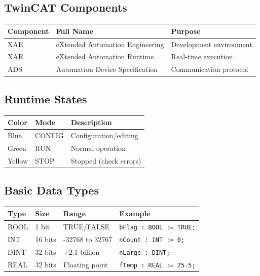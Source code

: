 \documentclass[11pt,a4paper]{article}
\begin{document}
\subsection*{TwinCAT Components}

\begin{table}[h]
\centering
\begin{tabular}{@{}lll@{}}
\toprule
\textbf{Component} & \textbf{Full Name} & \textbf{Purpose} \\
\midrule
XAE & eXtended Automation Engineering & Development environment \\
XAR & eXtended Automation Runtime & Real-time execution \\
ADS & Automation Device Specification & Communication protocol \\
\bottomrule
\end{tabular}
\end{table}

\subsection*{Runtime States}

\begin{table}[h]
\centering
\begin{tabular}{@{}lll@{}}
\toprule
\textbf{Color} & \textbf{Mode} & \textbf{Description} \\
\midrule
Blue & CONFIG & Configuration/editing \\
Green & RUN & Normal operation \\
Yellow & STOP & Stopped (check errors) \\
\bottomrule
\end{tabular}
\end{table}

\subsection*{Basic Data Types}

\begin{table}[h]
\centering
\begin{tabular}{@{}llll@{}}
\toprule
\textbf{Type} & \textbf{Size} & \textbf{Range} & \textbf{Example} \\
\midrule
BOOL & 1 bit & TRUE/FALSE & \texttt{bFlag : BOOL := TRUE;} \\
INT & 16 bits & -32768 to 32767 & \texttt{nCount : INT := 0;} \\
DINT & 32 bits & $\pm$2.1 billion & \texttt{nLarge : DINT;} \\
REAL & 32 bits & Floating point & \texttt{fTemp : REAL := 25.5;} \\
\bottomrule
\end{tabular}
\end{table}
\end{document}
